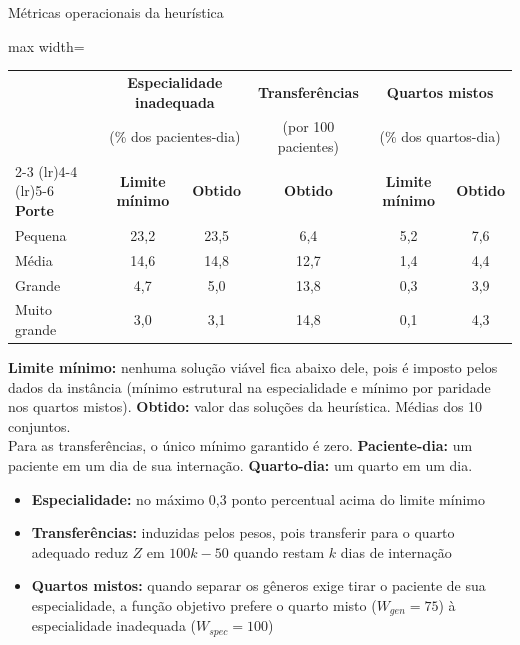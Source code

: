 \documentclass[aspectratio=169,10pt]{beamer}
\newcommand{\framerefs}{}
\newcommand{\slidecites}[1]{\gdef\framerefs{Referências: \cite{#1}}}
\gdef\framerefs{}%
\begin{document}
\begin{frame}{Métricas operacionais da heurística}
    \slidecites{schafer2023combining, demeester2010hybrid}
    \centering
    \small
    \begin{adjustbox}{max width=\textwidth}
    \begin{tabular}{lccccc}
        \toprule
        & \multicolumn{2}{c}{\textbf{Especialidade inadequada}} & \textbf{Transferências} & \multicolumn{2}{c}{\textbf{Quartos mistos}} \\
        & \multicolumn{2}{c}{(\% dos pacientes-dia)} & (por 100 pacientes) & \multicolumn{2}{c}{(\% dos quartos-dia)} \\
        \cmidrule(lr){2-3} \cmidrule(lr){4-4} \cmidrule(lr){5-6}
        \textbf{Porte} & \textbf{Limite mínimo} & \textbf{Obtido} & \textbf{Obtido} & \textbf{Limite mínimo} & \textbf{Obtido} \\
        \midrule
        Pequena      & 23,2 & 23,5 & 6,4  & 5,2 & 7,6 \\
        Média        & 14,6 & 14,8 & 12,7 & 1,4 & 4,4 \\
        Grande       & 4,7  & 5,0  & 13,8 & 0,3 & 3,9 \\
        Muito grande & 3,0  & 3,1  & 14,8 & 0,1 & 4,3 \\
        \bottomrule
    \end{tabular}
    \end{adjustbox}

    \vspace{0.15cm}
    {\scriptsize \textbf{Limite mínimo:} nenhuma solução viável fica abaixo dele, pois é imposto pelos dados da instância (mínimo estrutural na especialidade e mínimo por paridade nos quartos mistos). \textbf{Obtido:} valor das soluções da heurística. Médias dos 10 conjuntos.\\ Para as transferências, o único mínimo garantido é zero. \textbf{Paciente-dia:} um paciente em um dia de sua internação. \textbf{Quarto-dia:} um quarto em um dia.\par}

    \vspace{0.3cm}
    \normalsize
    \begin{itemize}
        \item \textbf{Especialidade:} no máximo 0,3 ponto percentual acima do limite mínimo
        \item \textbf{Transferências:} induzidas pelos pesos, pois transferir para o quarto adequado reduz $Z$ em $100k - 50$ quando restam $k$ dias de internação
        \item \textbf{Quartos mistos:} quando separar os gêneros exige tirar o paciente de sua especialidade, a função objetivo prefere o quarto misto ($W_{gen} = 75$) à especialidade inadequada ($W_{spec} = 100$)
    \end{itemize}
\end{frame}
\end{document}
